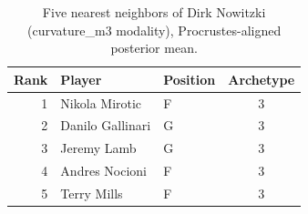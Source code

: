\begin{table}[htbp]
  \centering\small
  \begin{tabular}{rllc}
    \toprule
    Rank & Player & Position & Archetype \\
    \midrule
    1 & Nikola Mirotic & F & 3 \\
    2 & Danilo Gallinari & G & 3 \\
    3 & Jeremy Lamb & G & 3 \\
    4 & Andres Nocioni & F & 3 \\
    5 & Terry Mills & F & 3 \\
    \bottomrule
  \end{tabular}
  \caption{Five nearest neighbors of Dirk Nowitzki (curvature_m3 modality), Procrustes-aligned posterior mean.}
  \label{tab:Dirk_Nowitzki_neighbors_curvature_m3}
\end{table}

